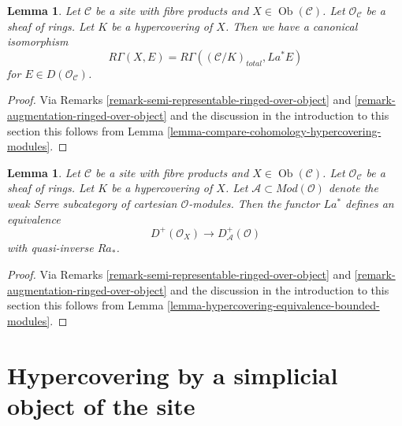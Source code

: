 \documentclass{stacks-project}
\theoremstyle{plain}
\newtheorem{lemma}[subsection]{Lemma}
\theoremstyle{definition}
\theoremstyle{remark}
\numberwithin{equation}{subsection}
\def\Ob{\mathop{\mathrm{Ob}}\nolimits}
\begin{document}
\begin{lemma}
\label{lemma-compare-cohomology-hypercovering-X-modules}
Let $\mathcal{C}$ be a site with fibre products and $X \in \Ob(\mathcal{C})$.
Let $\mathcal{O}_\mathcal{C}$ be a sheaf of rings.
Let $K$ be a hypercovering of $X$.
Then we have a canonical isomorphism
$$
R\Gamma(X, E) = R\Gamma((\mathcal{C}/K)_{total}, La^*E)
$$
for $E \in D(\mathcal{O}_\mathcal{C})$.
\end{lemma}

\begin{proof}
Via Remarks \ref{remark-semi-representable-ringed-over-object} and
\ref{remark-augmentation-ringed-over-object} and the discussion in
the introduction to this section
this follows from Lemma \ref{lemma-compare-cohomology-hypercovering-modules}.
\end{proof}

\begin{lemma}
\label{lemma-hypercovering-X-equivalence-bounded-modules}
Let $\mathcal{C}$ be a site with fibre products and $X \in \Ob(\mathcal{C})$.
Let $\mathcal{O}_\mathcal{C}$ be a sheaf of rings.
Let $K$ be a hypercovering of $X$.
Let $\mathcal{A} \subset \textit{Mod}(\mathcal{O})$
denote the weak Serre subcategory of cartesian $\mathcal{O}$-modules.
Then the functor $La^*$ defines an equivalence
$$
D^+(\mathcal{O}_X) \longrightarrow D_\mathcal{A}^+(\mathcal{O})
$$
with quasi-inverse $Ra_*$.
\end{lemma}

\begin{proof}
Via Remarks \ref{remark-semi-representable-ringed-over-object} and
\ref{remark-augmentation-ringed-over-object} and the discussion in
the introduction to this section
this follows from Lemma \ref{lemma-hypercovering-equivalence-bounded-modules}.
\end{proof}










\section{Hypercovering by a simplicial object of the site}
\label{section-hypercovering}
\end{document}
